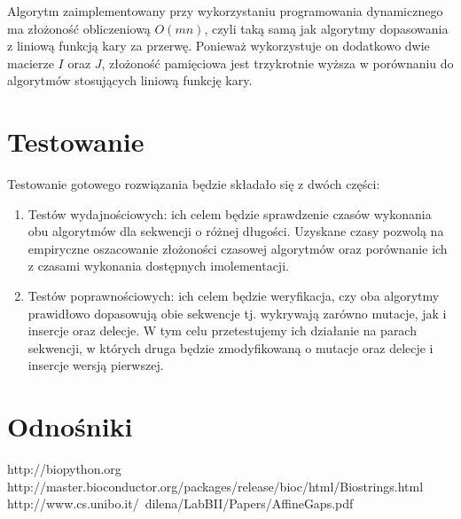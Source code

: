 \documentclass[a4paper,10pt]{article}
\begin{document}
	
	Algorytm zaimplementowany przy wykorzystaniu programowania dynamicznego ma złożoność obliczeniową $O(mn)$, czyli taką samą jak algorytmy dopasowania z liniową funkcją kary za przerwę. Ponieważ wykorzystuje on dodatkowo dwie macierze $I$ oraz $J$, złożoność pamięciowa jest trzykrotnie wyższa w porównaniu do algorytmów stosujących liniową funkcję kary.

	\section{Testowanie}

	Testowanie gotowego rozwiązania będzie składało się z dwóch części:
	\begin{enumerate}
		\item Testów wydajnościowych: ich celem będzie sprawdzenie czasów wykonania obu algorytmów dla sekwencji o różnej długości. Uzyskane czasy pozwolą na empiryczne oszacowanie złożoności czasowej algorytmów oraz porównanie ich z czasami wykonania dostępnych imolementacji.
		\item Testów poprawnościowych: ich celem będzie weryfikacja, czy oba algorytmy prawidłowo dopasowują obie sekwencje tj. wykrywają zarówno mutacje, jak i insercje oraz delecje. W tym celu przetestujemy ich działanie na parach sekwencji, w których druga będzie zmodyfikowaną o mutacje oraz delecje i insercje wersją pierwszej.
	\end{enumerate}

	\section{Odnośniki}

	\begin{thebibliography}{99}
		 http://biopython.org
		 http://master.bioconductor.org/packages/release/bioc/html/Biostrings.html
		 http://www.cs.unibo.it/~dilena/LabBII/Papers/AffineGaps.pdf
	\end{thebibliography}
\end{document}
